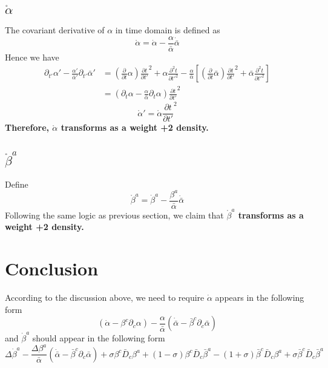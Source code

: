 \documentclass{article}
\begin{document}
\subsection{$\mathring{\alpha}$}
The covariant derivative of $\alpha$ in time domain is defined as
\[
\mathring{\alpha} = {\dot \alpha} - \frac{\alpha}{{\bar \alpha}}{\dot {\bar \alpha}}
\]
Hence we have
\begin{align*}
\partial_{t'}\alpha' - \frac{\alpha'}{{\bar \alpha}'}\partial_{t'}{\bar \alpha}' & =  (\frac{\partial }{\partial t}\alpha){\frac{\partial t}{\partial t'}}^2 +  \alpha\frac{\partial^2 t}{{\partial t'}^2} - \frac{\alpha}{{\bar \alpha}}[ (\frac{\partial }{\partial t}{\bar\alpha}){\frac{\partial t}{\partial t'}}^2 +  {\bar \alpha}\frac{\partial^2 t}{{\partial t'}^2}]\\
& = (\partial_{t}\alpha - \frac{\alpha}{{\bar \alpha}}\partial_{t}\alpha){\frac{\partial t}{\partial t'}}^2
\end{align*}
\[
\mathring{\alpha}' = \mathring{\alpha}{\frac{\partial t}{\partial t'}}^2
\]
{\bf {\color{red}Therefore, $\mathring{\alpha}$ transforms as a weight +2 density.}}
\subsection{$\mathring{\beta}^{a}$}
Define
\[
\mathring{\beta}^{a} = {\dot \beta}^{a} - \frac{\beta^{a}}{{\bar \alpha}}{\dot {\bar \alpha}}
\]
Following the same logic as previous section, we claim that {\bf {\color{red}$\mathring{\beta}^{a}$ transforms as a weight +2 density. }}

\section{Conclusion}
According to the discussion above, we need to require ${\dot \alpha}$ appears in the following form
\[
\boxed{
({\dot \alpha} - \beta^{c}\partial_{c}\alpha) - \frac{\alpha}{{\bar \alpha}}({\dot {\bar \alpha}} - {\bar \beta}^{c} \partial_{c}{\bar \alpha})
}
\]
and ${\dot \beta}^{a}$ should appear in the following form
\[
\boxed{
\Delta {\dot \beta}^{a} - \frac{\Delta \beta^{a}}{{\bar \alpha}}({\dot {\bar \alpha}} - {\bar \beta}^{c}\partial_{c}{\bar \alpha}) + \sigma \beta^{c}{\bar D}_{c}\beta^{a} + (1 - \sigma)\beta^{c}{\bar D}_{c}{\bar \beta}^{a} - (1 + \sigma){\bar \beta}^{c}{\bar D}_{c}\beta^{a} + \sigma{\bar \beta}^{c}{\bar D}_{c}{\bar \beta}^{a} 
}
\]
\end{document}
